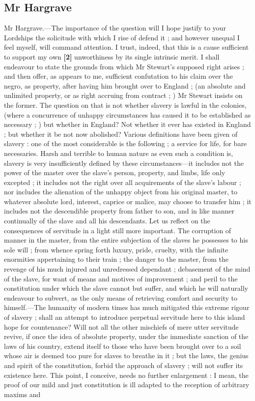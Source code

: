 \documentclass[a4paper]{article}
\begin{document}
\subsection{Mr Hargrave}
Mr Hargrave.---The importance of the question will I hope justify to your Lordships the solicitude with which I rise of defend it ; and however unequal I feel myself, will command attention. I trust, indeed, that this is a cause sufficient to support my own \textbf{[2]} unworthiness by its single intrinsic merit. I shall endeavour to state the grounds from which Mr Stewart's supposed right arises ; and then offer, as appears to me, sufficient confutation to his claim over the negro, as property, after having him brought over to England ; (an absolute and unlimited property, or as right accruing from contract ; ) Mr Stewart insists on the former. The question on that is not whether slavery is lawful in the colonies, (where a concurrence of unhappy circumstances has caused it to be established as necessary ; ) but whether in England? Not whether it  ever has existed in England ; but whether it be not now abolished? Various definitions have been given of slavery : one of the most considerable is the following ; a service for life, for bare necessaries. Harsh and terrible to human nature as even such a condition is, slavery is very insufficiently defined by these circumstances---it includes not the power of the master over the slave's person, property, and limbs, life only excepted ; it includes not the right over all acquirements of the slave's labour ; nor includes the alienation of the unhappy object from his original master, to whatever absolute lord, interest, caprice or malice, may choose to transfer him ; it includes not the descendible property from father to son, and in like manner continually of the slave and all his descendants. Let us reflect on the consequences of servitude in a light still more important. The corruption of manner in the master, from the entire subjection of the slaves he possesses to his sole will ; from whence spring forth luxury, pride, cruelty, with the infinite enormities appertaining to their train ; the danger to the master, from the revenge of his much injured and unredressed dependant ; debasement of the mind of the slave, for want of means and motives of improvement ; and peril to the constitution under which the slave cannot but suffer, and which he will naturally endeavour to subvert, as the only means of retrieving comfort and security to himself.---The humanity of modern times has much mitigated this extreme rigour of slavery ; shall an attempt to introduce perpetual servitude here to this island hope for countenance? Will not all the other mischiefs of mere utter servitude revive, if once the idea of absolute property, under the immediate sanction of the laws of his country, extend itself to those who have been brought over to a soil whose air is deemed too pure for slaves to breathe in it ; but the laws, the genius and spirit of the constitution, forbid the approach of slavery ; will not suffer its existence here. This point, I conceive, needs no further enlargement : I mean, the proof of our mild and just constitution is ill adapted to the reception of arbitrary maxims and 
\end{document}
